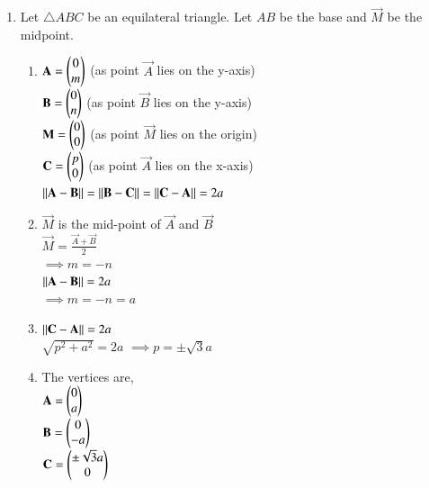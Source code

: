 \renewcommand{\theequation}{\theenumi}
\begin{enumerate}[label=\arabic*.,ref=\thesubsubsection.\theenumi]
%
\item Let $\triangle{ABC}$ be an equilateral triangle. Let $AB$ be the base and $\vec{M}$ be the midpoint.
\begin{enumerate}

\item $\mathbf{A} = \begin{pmatrix}0\\m\end{pmatrix}$ (as point $\vec{A}$ lies on the y-axis) \\
$\mathbf{B} = \begin{pmatrix}0\\n\end{pmatrix}$ (as point $\vec{B}$ lies on the y-axis) \\
$\mathbf{M} = \begin{pmatrix}0\\0\end{pmatrix}$ (as point $\vec{M}$ lies on the origin) \\
$\mathbf{C} = \begin{pmatrix}p\\0\end{pmatrix}$ (as point $\vec{A}$ lies on the x-axis) 
\\

$\left\lVert\mathbf{A}-\mathbf{B}\right\rVert = \left\lVert\mathbf{B}-\mathbf{C}\right\rVert = \left\lVert\mathbf{C}-\mathbf{A}\right\rVert = 2a$

\item $\vec{M}$ is the mid-point of $\vec{A}$ and $\vec{B}$ \\
$\vec{M} = \frac{\vec{A}+\vec{B}}{2}$ \\
$\implies m = -n$  \\
$\left\lVert\mathbf{A}-\mathbf{B}\right\rVert = 2a$ \\ 
$\implies m = -n = a$ \\


\item $\left\lVert\mathbf{C}-\mathbf{A}\right\rVert = 2a$ \\
$\sqrt{p^2+a^2} = 2a$
$\implies p = \pm\sqrt{3}a$\\


\item The vertices are, \\
$\mathbf{A} = \begin{pmatrix}0\\a\end{pmatrix}$  \\
$\mathbf{B} = \begin{pmatrix}0\\-a\end{pmatrix}$ \\
$\mathbf{C} = \begin{pmatrix}\pm\sqrt{3}a\\0\end{pmatrix}$


\end{enumerate}
\end{enumerate}
